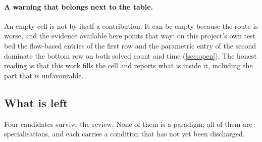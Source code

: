 \paragraph{A warning that belongs next to the table.} An empty cell is not by
itself a contribution. It can be empty because the route is worse, and the
evidence available here points that way: on this project's own test bed the
flow-based entries of the first row and the parametric entry of the second
dominate the bottom row on both solved count and time (\cref{sec:open}). The
honest reading is that this work fills the cell and reports what is inside it,
including the part that is unfavourable.

\subsection{What is left}

Four candidates survive the review. None of them is a paradigm; all of them are
specialisations, and each carries a condition that has not yet been discharged.

